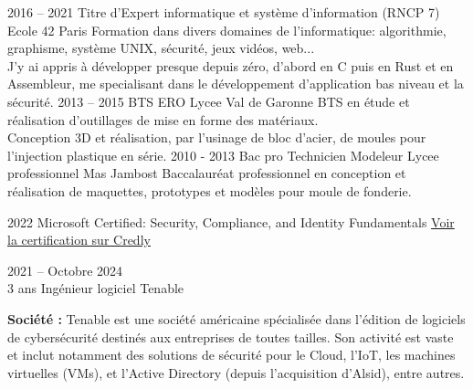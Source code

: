 \documentclass[8pt]{developercv} %
\begin{document}
\begin{entrylist}
    \entry
    {2016 -- 2021}
    {Titre d'Expert informatique et système d'information (RNCP 7)}
    {Ecole 42 Paris}
    {
        Formation dans divers domaines de l'informatique: algorithmie, graphisme, système UNIX, sécurité, jeux vidéos, web...\\
        J'y ai appris à développer presque depuis zéro, d'abord en C puis en Rust et en Assembleur, me specialisant dans le développement d'application bas niveau et la sécurité.
    }
    \entry
    {2013 -- 2015}
    {BTS ERO}
    {Lycee Val de Garonne}
    {
        BTS en étude et réalisation d'outillages de mise en forme des matériaux.\\
        Conception 3D et réalisation, par l'usinage de bloc d'acier, de moules pour l'injection plastique en série.
    }
    \entry
    {2010 - 2013}
    {Bac pro Technicien Modeleur}
    {Lycee professionnel Mas Jambost}
    {
        Baccalauréat professionnel en conception et réalisation de maquettes, prototypes et modèles pour moule de fonderie.
    }
\end{entrylist}

\vfill %
\begin{entrylist}
    \entry
    {2022}
    {Microsoft Certified: Security, Compliance, and Identity Fundamentals}
    {}
    {\href{https://www.credly.com/badges/c1e67948-af54-4281-b052-8b39de08e731/public_url}{Voir la certification sur Credly}}
\end{entrylist}
\vfill %

\begin{entrylisthrules}
    \entry
    {2021 -- Octobre 2024\\\footnotesize{3 ans}}
    {Ingénieur logiciel}
    {Tenable}
    {}
\end{entrylisthrules}

\textbf{Société :} Tenable est une société américaine spécialisée dans l'édition de logiciels de cybersécurité destinés aux entreprises de toutes tailles. Son activité est vaste et inclut notamment des solutions de sécurité pour le Cloud, l'IoT, les machines virtuelles (VMs), et l'Active Directory (depuis l'acquisition d'Alsid), entre autres.\\
\end{document}

